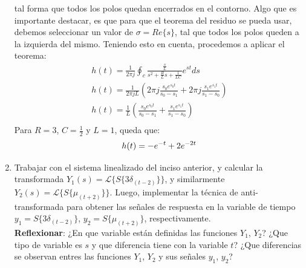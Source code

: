 \documentclass[12pt,a4paper]{report}
\begin{document}
\begin{enumerate}[label=\alph*)]
    tal forma que todos los polos quedan encerrados en el contorno. Algo que es importante destacar,
    es que para que el teorema del residuo se pueda usar, debemos seleccionar un valor de $\sigma = Re\{s\}$, tal que
    todos los polos queden a la izquierda del mismo. Teniendo esto en cuenta, procedemos a aplicar el teorema:
    \begin{gather*}
      h(t) = \frac{1}{2\pi j} \oint_c \frac{\frac{s}{L}}{s^2 + \frac{R}{L} s + \frac{1}{LC}} e^{st} ds\\[6pt]
      h(t) = \frac{1}{2\pi j L} \left(2\pi j \frac{s_0 e^{s_0t}}{s_0 - s_1} +
        2\pi j \frac{s_1 e^{s_1t}}{s_1 - s_0}\right)\\[6pt]
      h(t) = \frac{1}{L} \left(\frac{s_0 e^{s_0t}}{s_0 - s_1} + \frac{s_1 e^{s_1t}}{s_1 - s_0}\right)\\[6pt]
    \end{gather*}
    Para $R = 3$, $C = \frac{1}{2}$ y $L = 1$, queda que:
    \begin{equation*}
      h(t) = -e^{-t} + 2e^{-2t}\\[6pt]
    \end{equation*}

  \item Trabajar con el sistema linealizado del inciso anterior, y calcular la transformada
    $Y_1(s) = \mathcal{L}\{S\{3\delta_{(t-2)}\}\}$, y similarmente $Y_2(s) = \mathcal{L}\{S\{\mu_{(t+2)}\}\}$. Luego, implementar la técnica
    de anti-transformada para obtener las señales de respuesta en la variable de tiempo $y_1 = S\{3\delta_{(t-2)}\}$,
    $y_2 = S\{\mu_{(t+2)}\}$, respectivamente.\\
    \textbf{Reflexionar}: ¿En que variable están definidas las funciones $Y_1$, $Y_2$? ¿Que tipo de variable es $s$ y que
    diferencia tiene con la variable $t$? ¿Que diferencias se observan entres las funciones $Y_1$, $Y_2$ y sus señales
    $y_1$, $y_2$?


\end{enumerate}
\end{document}
